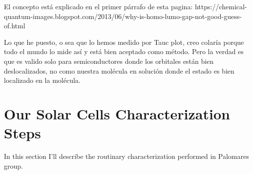 	El concepto está explicado en el primer párrafo de esta pagina:
	https://chemical-quantum-images.blogspot.com/2013/06/why-is-homo-lumo-gap-not-good-guess-of.html

	Lo que he puesto, o sea que lo hemos medido por Tauc plot, creo colaría
	porque todo el mundo lo mide así y está bien aceptado como método. Pero
	la verdad es que es valido solo para semiconductores donde los orbitales
	están bien deslocalizados, no como nuestra molécula en solución donde el
	estado es bien localizado en la molécula.

\section{Our Solar Cells Characterization Steps}

	In this section I'll describe the routinary characterization performed in Palomares group.


